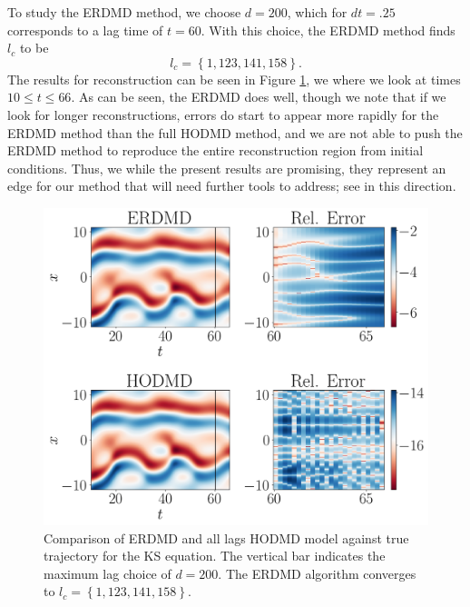 \documentclass[a4paper,11pt]{article}
\begin{document}
To study the ERDMD method, we choose $d=200$, which for $dt=.25$ corresponds to a lag time of $t=60$.  With this choice, the ERDMD method finds $l_{c}$ to be 
\[
l_{c}=\left\{1, 123, 141, 158\right\}.
\]
The results for reconstruction can be seen in Figure \ref{fig:ks_compare_d_200}, we where we look at times $10\leq t \leq 66$.  As can be seen, the ERDMD does well, though we note that if we look for longer reconstructions, errors do start to appear more rapidly for the ERDMD method than the full HODMD method, and we are not able to push the ERDMD method to reproduce the entire reconstruction region from initial conditions.  Thus, we while the present results are promising, they represent an edge for our method that will need further tools to address; see \cite{curtis_dldmd} in this direction.    
\begin{figure}[!h]
\centering
\includegraphics[width=1\textwidth]{ks_dynamics_compare}
\caption{Comparison of ERDMD and all lags HODMD model against true trajectory for the KS equation.  The vertical bar indicates the maximum lag choice of $d=200$. The ERDMD algorithm converges to $l_{c}=\left\{1, 123, 141, 158\right\}$.}
\label{fig:ks_compare_d_200}
\end{figure} 
 
\end{document}
